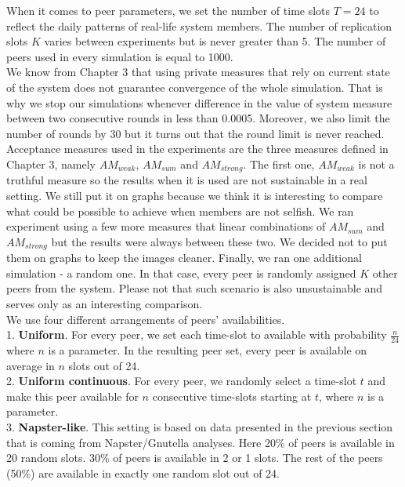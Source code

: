 \documentclass{pracamgren}
\begin{document}
When it comes to peer parameters, we set the number of time slots $T=24$ to reflect the daily patterns of real-life system members. The number of replication slots $K$ varies between experiments but is never greater than 5. The number of peers used in every simulation is equal to 1000.\\

We know from Chapter 3 that using private measures that rely on current state of the system does not guarantee convergence of the whole simulation. That is why we stop our simulations whenever difference in the value of system measure between two consecutive rounds in less than 0.0005. Moreover, we also limit the number of rounds by 30 but it turns out that the round limit is never reached.\\

Acceptance measures used in the experiments are the three measures defined in Chapter 3, namely $AM_{weak}$, $AM_{sum}$ and $AM_{strong}$. The first one, $AM_{weak}$ is not a truthful measure so the results when it is used are not sustainable in a real setting. We still put it on graphs because we think it is interesting to compare what could be possible to achieve when members are not selfish. We ran experiment using a few more measures that linear combinations of $AM_{sum}$ and $AM_{strong}$ but the results were always between these two. We decided not to put them on graphs to keep the images cleaner. Finally, we ran one additional simulation - a random one. In that case, every peer is randomly assigned $K$ other peers from the system. Please not that such scenario is also unsustainable and serves only as an interesting comparison.\\

We use four different arrangements of peers' availabilities.\\

1. {\bf Uniform}. For every peer, we set each time-slot to available with probability $\frac{n}{24}$ where $n$ is a parameter. In the resulting peer set, every peer is available on average in $n$ slots out of 24.\\

2. {\bf Uniform continuous}. For every peer, we randomly select a time-slot $t$ and make this peer available for $n$ consecutive time-slots starting at $t$, where $n$ is a parameter. \\

3. {\bf Napster-like}. This setting is based on data presented in the previous section that is coming from Napster/Gnutella analyses. Here 20\% of peers is available in 20 random slots. 30\% of peers is available in 2 or 1 slots. The rest of the peers (50\%) are available in exactly one random slot out of 24.\\
\end{document}
